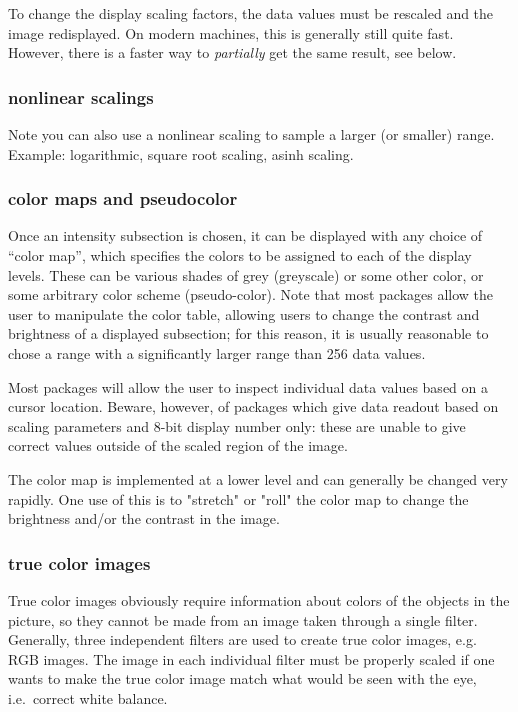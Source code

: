 \documentclass{article}
\begin{document}
To change the display scaling factors, the data values must be
rescaled and the image redisplayed. On modern machines, this is
generally still quite fast. However, there is a faster way to
\emph{partially} get the same result, see below.


\subsubsection*{nonlinear scalings}
Note you can also use a nonlinear scaling to sample a larger (or
smaller) range. Example: logarithmic, square root scaling, asinh
scaling.

\subsubsection*{color maps and pseudocolor}
Once an intensity subsection is chosen, it can be displayed with any
choice of ``color map'', which specifies the colors to be assigned to
each of the display levels. These can be various shades of grey
(greyscale) or some other color, or some arbitrary color scheme
(pseudo-color). Note that most packages allow the user to manipulate
the color table, allowing users to change the contrast and brightness
of a displayed subsection; for this reason, it is usually reasonable
to chose a range with a significantly larger range than 256 data
values.

Most packages will allow the user to inspect individual data values
based on a cursor location. Beware, however, of packages which give
data readout based on scaling parameters and 8-bit display number
only: these are unable to give correct values outside of the scaled
region of the image.

The color map is implemented at a lower level and can generally be
changed very rapidly. One use of this is to "stretch" or "roll" the
color map to change the brightness and/or the contrast in the image.

\subsubsection*{true color images}
True color images obviously require information about colors of the
objects in the picture, so they cannot be made from an image taken
through a single filter. Generally, three independent filters are used
to create true color images, e.g. RGB images. The image in each
individual filter must be properly scaled if one wants to make the
true color image match what would be seen with the eye, i.e.\ correct
white balance.
\end{document}
